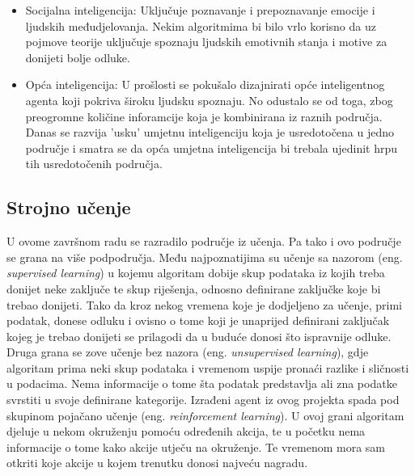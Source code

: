 \begin{itemize}
	\item Socijalna inteligencija: Uključuje poznavanje i prepoznavanje emocije i ljudskih međudjelovanja. Nekim algoritmima bi bilo vrlo korisno da uz pojmove teorije uključuje spoznaju ljudskih emotivnih stanja i motive za donijeti bolje odluke.
	
	\item Opća inteligencija: U prošlosti se pokušalo dizajnirati opće inteligentnog agenta koji pokriva široku ljudsku spoznaju. No odustalo se od toga, zbog preogromne količine inforamcije koja je kombinirana iz raznih područja. Danas se razvija 'usku' umjetnu inteligenciju koja je usredotočena u jedno područje i smatra se da opća umjetna inteligencija bi trebala ujedinit hrpu tih usredotočenih područja.
\end{itemize}

\subsection{Strojno učenje}
U ovome završnom radu se razradilo područje iz učenja. Pa tako i ovo područje se grana na više podpodručja. Među najpoznatijima su učenje sa nazorom (eng. \textit{supervised learning}) u kojemu algoritam dobije skup podataka iz kojih treba donijet neke zaključe te skup riješenja, odnosno definirane zaključke koje bi trebao donijeti. Tako da kroz nekog vremena koje je dodjeljeno za učenje, primi podatak, donese odluku i ovisno 
o tome koji je unaprijed definirani zaključak kojeg je trebao donijeti se prilagodi da u buduće donosi što ispravnije odluke. Druga grana se zove učenje bez nazora (eng. \textit{unsupervised learning}), gdje algoritam prima neki skup podataka i vremenom uspije pronaći razlike i sličnosti u podacima. Nema informacije o tome šta podatak predstavlja ali zna podatke svrstiti u svoje definirane kategorije. Izrađeni agent iz ovog projekta spada pod skupinom pojačano učenje (eng. \textit{reinforcement learning}). U ovoj grani algoritam djeluje u nekom okruženju pomoću određenih akcija, te u početku nema informacije o tome kako akcije utječu na okruženje. Te vremenom mora sam otkriti koje akcije u kojem trenutku donosi najveću nagradu.
